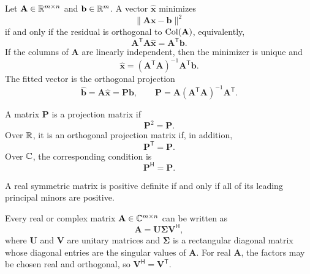     \begin{theorem}
        Let $\mathbf{A}\in\mathbb{R}^{m\times n}$ and
        $\mathbf{b}\in\mathbb{R}^m$. A vector $\widehat{\mathbf{x}}$ minimizes
        \[
            \|\mathbf{A}\mathbf{x}-\mathbf{b}\|^2
        \]
        if and only if the residual is orthogonal to
        $\operatorname{Col}(\mathbf{A})$, equivalently,
        \[
            \mathbf{A}^{\mathsf T}\mathbf{A}\widehat{\mathbf{x}}
            =
            \mathbf{A}^{\mathsf T}\mathbf{b}.
        \]
        If the columns of $\mathbf{A}$ are linearly independent, then the
        minimizer is unique and
        \[
            \widehat{\mathbf{x}}
            =
            (\mathbf{A}^{\mathsf T}\mathbf{A})^{-1}
            \mathbf{A}^{\mathsf T}\mathbf{b}.
        \]
        The fitted vector is the orthogonal projection
        \[
            \widehat{\mathbf{b}}
            =
            \mathbf{A}\widehat{\mathbf{x}}
            =
            \mathbf{P}\mathbf{b},
            \qquad
            \mathbf{P}
            =
            \mathbf{A}(\mathbf{A}^{\mathsf T}\mathbf{A})^{-1}
            \mathbf{A}^{\mathsf T}.
        \]
    \end{theorem}

    \begin{proposition}
        A matrix $\mathbf{P}$ is a projection matrix if
        \[
            \mathbf{P}^2=\mathbf{P}.
        \]
        Over $\mathbb{R}$, it is an orthogonal projection matrix if, in addition,
        \[
            \mathbf{P}^{\mathsf T}=\mathbf{P}.
        \]
        Over $\mathbb{C}$, the corresponding condition is
        \[
            \mathbf{P}^{\mathsf H}=\mathbf{P}.
        \]
    \end{proposition}

    \begin{theorem}
        A real symmetric matrix is positive definite if and only if all of its
        leading principal minors are positive.
    \end{theorem}

    \begin{theorem}
        Every real or complex matrix $\mathbf{A}\in\mathbb{C}^{m\times n}$ can be
        written as
        \[
            \mathbf{A}
            =
            \mathbf{U}\boldsymbol{\Sigma}\mathbf{V}^{\mathsf H},
        \]
        where $\mathbf{U}$ and $\mathbf{V}$ are unitary matrices and
        $\boldsymbol{\Sigma}$ is a rectangular diagonal matrix whose diagonal
        entries are the singular values of $\mathbf{A}$. For real
        $\mathbf{A}$, the factors may be chosen real and orthogonal, so
        $\mathbf{V}^{\mathsf H}=\mathbf{V}^{\mathsf T}$.
    \end{theorem}

